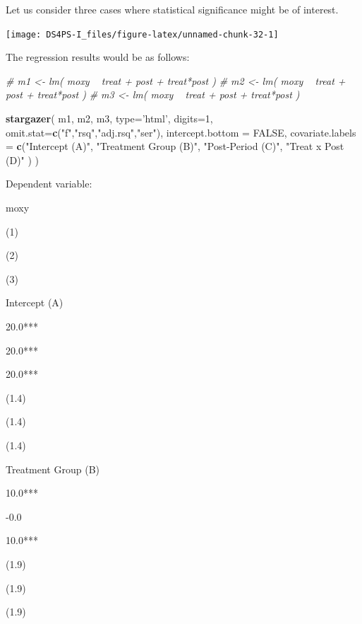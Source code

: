 \documentclass[]{book}
\newenvironment{Shaded}{\begin{snugshade}}{\end{snugshade}}
\newcommand{\CommentTok}[1]{\textcolor[rgb]{0.56,0.35,0.01}{\textit{#1}}}
\newcommand{\DataTypeTok}[1]{\textcolor[rgb]{0.13,0.29,0.53}{#1}}
\newcommand{\DecValTok}[1]{\textcolor[rgb]{0.00,0.00,0.81}{#1}}
\newcommand{\KeywordTok}[1]{\textcolor[rgb]{0.13,0.29,0.53}{\textbf{#1}}}
\newcommand{\NormalTok}[1]{#1}
\newcommand{\OtherTok}[1]{\textcolor[rgb]{0.56,0.35,0.01}{#1}}
\newcommand{\StringTok}[1]{\textcolor[rgb]{0.31,0.60,0.02}{#1}}
\theoremstyle{definition}
\theoremstyle{definition}
\theoremstyle{definition}
\theoremstyle{remark}
\begin{document}
Let us consider three cases where statistical significance might be of
interest.

\begin{center}\texttt{[image: DS4PS-I\_files/figure-latex/unnamed-chunk-32-1]} \end{center}

The regression results would be as follows:

\begin{Shaded}
\begin{Highlighting}[]


\CommentTok{# m1 <- lm( moxy ~ treat + post + treat*post )}
\CommentTok{# m2 <- lm( moxy ~ treat + post + treat*post )}
\CommentTok{# m3 <- lm( moxy ~ treat + post + treat*post )}



\KeywordTok{stargazer}\NormalTok{( m1, m2, m3, }\DataTypeTok{type=}\StringTok{'html'}\NormalTok{, }\DataTypeTok{digits=}\DecValTok{1}\NormalTok{,}
           \DataTypeTok{omit.stat=}\KeywordTok{c}\NormalTok{(}\StringTok{"f"}\NormalTok{,}\StringTok{"rsq"}\NormalTok{,}\StringTok{"adj.rsq"}\NormalTok{,}\StringTok{"ser"}\NormalTok{),}
           \DataTypeTok{intercept.bottom =} \OtherTok{FALSE}\NormalTok{,}
           \DataTypeTok{covariate.labels =} \KeywordTok{c}\NormalTok{(}\StringTok{"Intercept (A)"}\NormalTok{, }\StringTok{"Treatment Group (B)"}\NormalTok{,}
                                \StringTok{"Post-Period (C)"}\NormalTok{, }\StringTok{"Treat x Post (D)"}\NormalTok{ ) )}
\end{Highlighting}
\end{Shaded}

Dependent variable:

moxy

(1)

(2)

(3)

Intercept (A)

20.0***

20.0***

20.0***

(1.4)

(1.4)

(1.4)

Treatment Group (B)

10.0***

-0.0

10.0***

(1.9)

(1.9)

(1.9)
\end{document}
